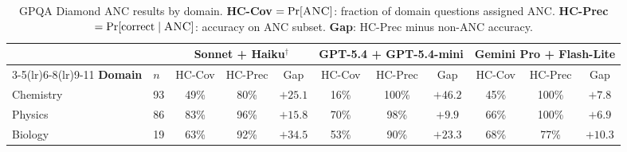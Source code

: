 \begin{table}[h]
\centering
\caption{GPQA Diamond ANC results by domain. \textbf{HC-Cov} $= \Pr[\textsc{ANC}]$: fraction of domain questions assigned ANC. \textbf{HC-Prec} $= \Pr[\text{correct} \mid \textsc{ANC}]$: accuracy on ANC subset. \textbf{Gap}: HC-Prec minus non-ANC accuracy.}
\label{tab:gpqa-domain}
\small
\setlength{\tabcolsep}{5pt}
\begin{tabular}{llccccccccc}
\toprule
 & & \multicolumn{3}{c}{\textbf{Sonnet + Haiku}$^\dagger$} & \multicolumn{3}{c}{\textbf{GPT-5.4 + GPT-5.4-mini}} & \multicolumn{3}{c}{\textbf{Gemini Pro + Flash-Lite}} \\
\cmidrule(lr){3-5}\cmidrule(lr){6-8}\cmidrule(lr){9-11}
\textbf{Domain} & $n$ & HC-Cov & HC-Prec & Gap & HC-Cov & HC-Prec & Gap & HC-Cov & HC-Prec & Gap \\
\midrule
Chemistry & 93 & 49\% & 80\% & $+25.1$ & 16\% & 100\% & $+46.2$ & 45\% & 100\% & $+7.8$ \\
Physics & 86 & 83\% & 96\% & $+15.8$ & 70\% & 98\% & $+9.9$ & 66\% & 100\% & $+6.9$ \\
Biology & 19 & 63\% & 92\% & $+34.5$ & 53\% & 90\% & $+23.3$ & 68\% & 77\% & $+10.3$ \\
\bottomrule
\end{tabular}
\end{table}
